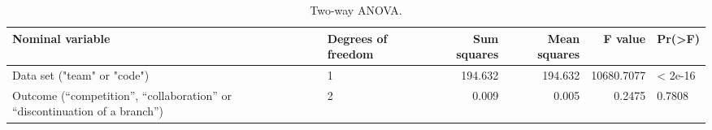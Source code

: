 \begin{table}[H]
\caption{Two-way ANOVA.}
\label{table:ch4_rq2_anova} 
\centering
\begin{tabu} to 
  \toprule
  Nominal variable & Degrees of freedom & Sum squares & Mean squares & F value & Pr(>F) \\
  \midrule
  Data set ("team" or "code") & 1 & 194.632 & 194.632 & 10680.7077 & < 2e-16 \\
  \midrule
  Outcome (“competition”,
  “collaboration”
  or
  “discontinuation of a branch”) & 2 & 0.009 & 0.005 & 0.2475 & 0.7808 \\
  \bottomrule
\end{tabu}
\end{table}
